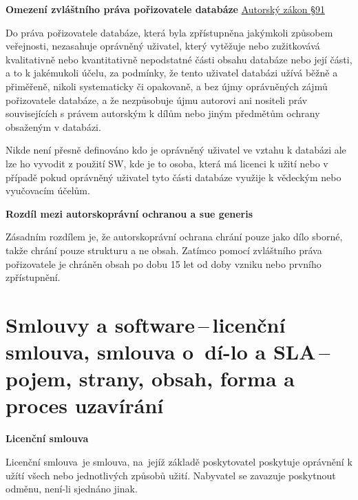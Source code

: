 \textbf{Omezení zvláštního práva pořizovatele databáze} \href{https://www.zakonyprolidi.cz/cs/2000-121#p91}{Autorský zákon §91}

Do práva pořizovatele databáze, která byla zpřístupněna jakýmkoli způsobem veřejnosti, nezasahuje oprávněný uživatel, který vytěžuje nebo zužitkovává kvalitativně nebo kvantitativně nepodstatné části obsahu databáze nebo její části, a to k jakémukoli účelu, za podmínky, že tento uživatel databázi užívá běžně a přiměřeně, nikoli systematicky či opakovaně, a bez újmy oprávněných zájmů pořizovatele databáze, a že nezpůsobuje újmu autorovi ani nositeli práv souvisejících s právem autorským k dílům nebo jiným předmětům ochrany obsaženým v databázi.

Nikde není přesně definováno kdo je oprávněný uživatel ve vztahu k databázi ale lze ho vyvodit z použití SW, kde je to osoba, která má licenci k užití nebo v případě pokud oprávněný uživatel tyto části databáze využije k vědeckým nebo vyučovacím účelům.

\vspace{0.3cm}
\begin{Large}
\textbf{Rozdíl mezi autorskoprávní ochranou a sue generis}
\end{Large}

Zásadním rozdílem je, že autorskoprávní ochrana chrání pouze jako dílo sborné, takže chrání pouze strukturu a ne obsah. Zatímco pomocí zvláštního práva pořizovatele je chráněn obsah po dobu 15 let od doby vzniku nebo prvního zpřístupnění.











\newpage
\section[Smlouvy a software\,--\,licenční smlouva, smlouva o~dílo a SLA\,--\,pojem, strany, obsah, forma a proces uzavírání]{Smlouvy a software\,--\,licenční smlouva, smlouva o~dí-lo a SLA\,--\,pojem, strany, obsah, forma a proces uzavírání}

\begin{Large}
\textbf{Licenční smlouva}
\end{Large} 

Licenční smlouva~je smlouva, na~jejíž základě poskytovatel poskytuje oprávnění k užítí všech nebo jednotlivých způsobů užití. Nabyvatel se zavazuje poskytnout odměnu, není-li sjednáno jinak. 

